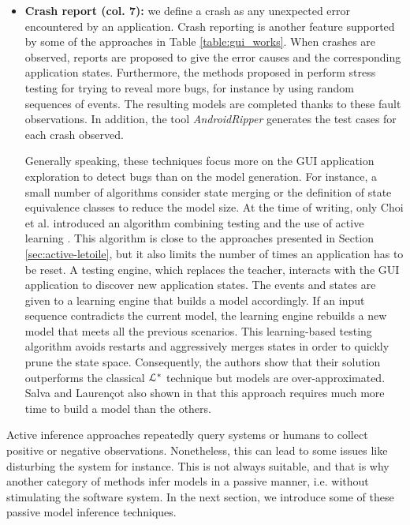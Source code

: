 \begin{itemize}
	\item \textbf{Crash report (col. 7):} we define a crash as
	any unexpected error encountered by an application.  Crash
	reporting is another feature supported by some of the
	approaches in Table \ref{table:gui_works}.  When crashes
	are observed, reports are proposed to give the error causes
	and the corresponding application states. Furthermore, the
	methods proposed in
	\cite{MobiGUITARIEEESoftware2014,guitar,SP15} perform stress
	testing for trying to reveal more bugs,  for instance by
	using random sequences of events. The resulting models are
	completed thanks to these fault observations. In addition,
	the tool \textit{AndroidRipper}
	\cite{Amalfitano:2012:UGR:2351676.2351717} generates the test
	cases for each crash observed.

	Generally speaking, these techniques focus more on the GUI
	application exploration to detect bugs than on the model
	generation. For instance, a small number of algorithms consider state
	merging or the definition of state equivalence classes to
	reduce the model size. At the time of writing, only Choi et
	al. introduced an algorithm combining testing and the use
	of active learning \cite{Choi2013}. This algorithm is close
	to the approaches presented in Section
	\ref{sec:active-letoile}, but it also limits the number of
	times an application has to be reset. A testing engine, which
	replaces the teacher, interacts with the GUI application to
	discover new application states. The events and states are
	given to a learning engine that builds a model accordingly.
	If an input sequence contradicts the current model, the
	learning engine rebuilds a new model that meets all the
	previous scenarios.  This learning-based testing algorithm
	avoids restarts and aggressively merges states in order to
	quickly prune the state space. Consequently, the authors show
	that their solution outperforms the classical
	$\EuScript{L}^*$ technique but models are over-approximated.
	Salva and Laurençot also shown in \cite{SP15} that this
	approach requires much more time to build a model than the
	others.
\end{itemize}

Active inference approaches repeatedly query systems or humans to
collect positive or negative observations. Nonetheless, this can
lead to some issues like disturbing the system for instance. This
is not always suitable, and that is why another category of
methods infer models in a passive manner, i.e. without
stimulating the software system.  In the next section, we
introduce some of these passive model inference techniques.

